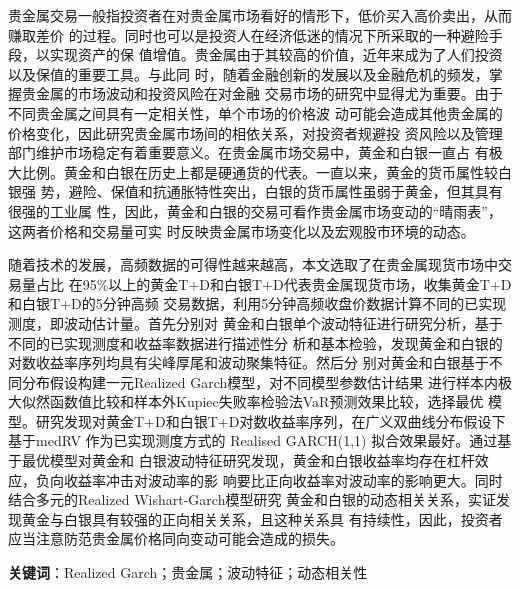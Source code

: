 \begin{cabstract}
  \renewcommand{\chapterlabel}{摘\hspace{2em}要}

贵金属交易一般指投资者在对贵金属市场看好的情形下，低价买入高价卖出，从而赚取差价
的过程。同时也可以是投资人在经济低迷的情况下所采取的一种避险手段，以实现资产的保
值增值。贵金属由于其较高的价值，近年来成为了人们投资以及保值的重要工具。与此同
时，随着金融创新的发展以及金融危机的频发，掌握贵金属的市场波动和投资风险在对金融
交易市场的研究中显得尤为重要。由于不同贵金属之间具有一定相关性，单个市场的价格波
动可能会造成其他贵金属的价格变化，因此研究贵金属市场间的相依关系，对投资者规避投
资风险以及管理部门维护市场稳定有着重要意义。在贵金属市场交易中，黄金和白银一直占
有极大比例。黄金和白银在历史上都是硬通货的代表。一直以来，黄金的货币属性较白银强
势，避险、保值和抗通胀特性突出，白银的货币属性虽弱于黄金，但其具有很强的工业属
性，因此，黄金和白银的交易可看作贵金属市场变动的“晴雨表”，这两者价格和交易量可实
时反映贵金属市场变化以及宏观股市环境的动态。

随着技术的发展，高频数据的可得性越来越高，本文选取了在贵金属现货市场中交易量占比
在95\%以上的黄金T+D和白银T+D代表贵金属现货市场，收集黄金T+D和白银T+D的5分钟高频
交易数据，利用5分钟高频收盘价数据计算不同的已实现测度，即波动估计量。首先分别对
黄金和白银单个波动特征进行研究分析，基于不同的已实现测度和收益率数据进行描述性分
析和基本检验，发现黄金和白银的对数收益率序列均具有尖峰厚尾和波动聚集特征。然后分
别对黄金和白银基于不同分布假设构建一元Realized Garch模型，对不同模型参数估计结果
进行样本内极大似然函数值比较和样本外Kupiec失败率检验法VaR预测效果比较，选择最优
模型。研究发现对黄金T+D和白银T+D对数收益率序列，在广义双曲线分布假设下基于medRV
作为已实现测度方式的 Realised GARCH(1,1) 拟合效果最好。通过基于最优模型对黄金和
白银波动特征研究发现，黄金和白银收益率均存在杠杆效应，负向收益率冲击对波动率的影
响要比正向收益率对波动率的影响更大。同时结合多元的Realized Wishart-Garch模型研究
黄金和白银的动态相关关系，实证发现黄金与白银具有较强的正向相关关系，且这种关系具
有持续性，因此，投资者应当注意防范贵金属价格同向变动可能会造成的损失。


  
  \bigbreak

  {\bfseries 关键词}：Realized Garch；贵金属；波动特征；动态相关性
   
\blankpage
\end{cabstract}




